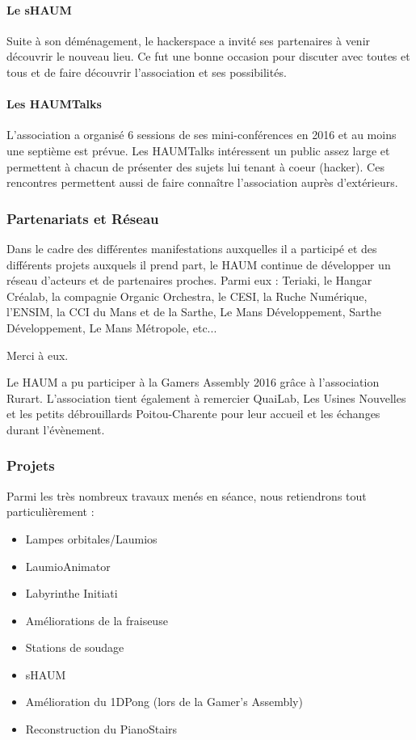 \documentclass[11pt]{article}
\begin{document}
\paragraph{Le sHAUM} Suite à son déménagement, le hackerspace a invité ses partenaires à venir découvrir le nouveau lieu. Ce fut une bonne occasion pour discuter avec toutes et tous et de faire découvrir l'association et ses possibilités.

\paragraph{Les HAUMTalks} L'association a organisé 6 sessions de ses mini-conférences en 2016 et au moins une septième est prévue. Les HAUMTalks intéressent un public assez large et permettent à chacun de présenter des sujets lui tenant à coeur (hacker). Ces rencontres permettent aussi de faire connaître l'association auprès d'extérieurs.

\subsubsection{Partenariats et Réseau}

Dans le cadre des différentes manifestations auxquelles il a participé et des différents projets auxquels il prend part, le HAUM continue de développer un réseau d'acteurs et de partenaires proches. Parmi eux : Teriaki, le Hangar Créalab, la compagnie Organic Orchestra, le CESI, la Ruche Numérique, l'ENSIM, la CCI du Mans et de la Sarthe, Le Mans Développement, Sarthe Développement, Le Mans Métropole, etc...

Merci à eux.

Le HAUM a pu participer à la Gamers Assembly 2016 grâce à l'association Rurart. L'association tient également à remercier QuaiLab, Les Usines Nouvelles et les petits débrouillards Poitou-Charente pour leur accueil et les échanges durant l'évènement.

\subsubsection{Projets}

Parmi les très nombreux travaux menés en séance, nous retiendrons tout particulièrement :

\begin{itemize}
    \item Lampes orbitales/Laumios
    \item LaumioAnimator
    \item Labyrinthe Initiati
    \item Améliorations de la fraiseuse
    \item Stations de soudage
    \item sHAUM
    \item Amélioration du 1DPong (lors de la Gamer's Assembly)
    \item Reconstruction du PianoStairs
\end{itemize}
\end{document}
